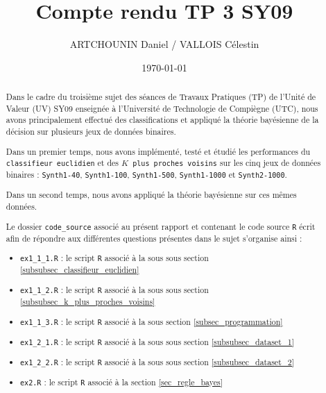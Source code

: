 \documentclass{article}
\title{Compte rendu TP 3 SY09}
\author{ARTCHOUNIN Daniel / VALLOIS Célestin}
\date{\today}
\begin{document}
\maketitle %

\thispagestyle{fancy} %



\begin{abstract}

Dans le cadre du troisième sujet des séances de Travaux Pratiques (TP) de l'Unité de Valeur (UV) SY09 enseignée à l'Université de Technologie de Compiègne (UTC), nous avons principalement effectué des classifications et appliqué la théorie bayésienne de la décision sur plusieurs jeux de données binaires.

Dans un premier temps, nous avons implémenté, testé et étudié les performances du \texttt{classifieur euclidien} et des \texttt{$K$ plus proches voisins} sur les cinq jeux de données binaires : \texttt{Synth1-40}, \texttt{Synth1-100}, \texttt{Synth1-500}, \texttt{Synth1-1000} et \texttt{Synth2-1000}.

Dans un second temps, nous avons appliqué la théorie bayésienne sur ces mêmes données.

Le dossier \texttt{code\_source} associé au présent rapport et contenant le code source \texttt{R} écrit afin de répondre aux différentes questions présentes dans le sujet s'organise ainsi : 

\begin{itemize}
  \item \texttt{ex1\_1\_1.R} : le script \texttt{R} associé à la sous sous section \ref{subsubsec_classifieur_euclidien}
  \item \texttt{ex1\_1\_2.R} : le script \texttt{R} associé à la sous sous section \ref{subsubsec_k_plus_proches_voisins}
  \item \texttt{ex1\_1\_3.R} :  le script \texttt{R} associé à la sous section \ref{subsec_programmation}
  \item \texttt{ex1\_2\_1.R} : le script \texttt{R} associé à la sous sous section \ref{subsubsec_dataset_1}
  \item \texttt{ex1\_2\_2.R} :  le script \texttt{R} associé à la sous sous section \ref{subsubsec_dataset_2}
  \item \texttt{ex2.R} : le script \texttt{R} associé à la section \ref{sec_regle_bayes}
\end{itemize}

\end{abstract}
\end{document}
